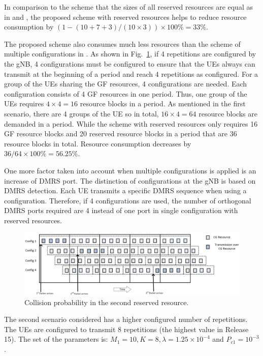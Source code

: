 \documentclass{ieeeaccess}
\begin{document}
In comparison to the scheme that the sizes of all reserved resources are equal as in \cite{ref10} and \cite{ref11}, the proposed scheme with reserved resources helps to reduce resource consumption by $(1 - (10+7+3)/(10\times3))\times100\% = 33\%$.

The proposed scheme also consumes much less resources than the scheme of multiple configurations in  \cite{ref7}. As shown in Fig.~\ref{fig14}, if 4 repetitions are configured by the gNB, 4 configurations must be configured to ensure that the UEs always can transmit at the beginning of a period and reach 4 repetitions as configured. For a group of the UEs sharing the GF resources, 4 configurations are needed. Each configuration consists of 4 GF resources in one period. Thus, one group of the UEs requires $4\times4 = 16$ resource blocks in a period. As mentioned in the first scenario, there are 4 groups of the UE so in total, $16\times4 = 64$ resource blocks are demanded in a period. While the scheme with reserved resources only requires 16 GF resource blocks and 20 reserved resource blocks in a period that are 36 resource blocks in total. Resource consumption decreases by $36/64\times100\% = 56.25\%$.

One more factor taken into account when multiple configurations is applied is an increase of DMRS port. The distinction of configurations at the gNB is based on DMRS detection. Each UE transmits a specific DMRS sequence when using a configuration. Therefore, if 4 configurations are used, the number of orthogonal DMRS ports required are 4 instead of one port in single configuration with reserved resources.

\begin{figure}[htbp]
\centerline{\includegraphics[scale=0.19]{fig14.png}}
\caption{Collision probability in the second reserved resource.}
\label{fig14}

\end{figure}

The second scenario considered has a higher configured number of repetitions. The UEs are configured to transmit 8 repetitions (the highest value in Release 15). The set of the parameters is: $M_1=10, K=8, \lambda=1.25\times10^{-4}$ and $P_{c1}=10^{-3}$.
\end{document}
